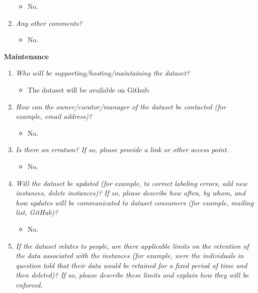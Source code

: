 \documentclass[
]{article}
\providecommand{\tightlist}{%
  \setlength{\itemsep}{0pt}\setlength{\parskip}{0pt}}
\begin{document}
\begin{enumerate}
  \begin{itemize}
  \tightlist
  \item
    No.
  \end{itemize}
\item
  \emph{Any other comments?}

  \begin{itemize}
  \tightlist
  \item
    No.
  \end{itemize}
\end{enumerate}

\textbf{Maintenance}

\begin{enumerate}
\def\labelenumi{\arabic{enumi}.}
\tightlist
\item
  \emph{Who will be supporting/hosting/maintaining the dataset?}

  \begin{itemize}
  \tightlist
  \item
    The dataset will be available on Github
  \end{itemize}
\item
  \emph{How can the owner/curator/manager of the dataset be contacted
  (for example, email address)?}

  \begin{itemize}
  \tightlist
  \item
    No.
  \end{itemize}
\item
  \emph{Is there an erratum? If so, please provide a link or other
  access point.}

  \begin{itemize}
  \tightlist
  \item
    No.
  \end{itemize}
\item
  \emph{Will the dataset be updated (for example, to correct labeling
  errors, add new instances, delete instances)? If so, please describe
  how often, by whom, and how updates will be communicated to dataset
  consumers (for example, mailing list, GitHub)?}

  \begin{itemize}
  \tightlist
  \item
    No.
  \end{itemize}
\item
  \emph{If the dataset relates to people, are there applicable limits on
  the retention of the data associated with the instances (for example,
  were the individuals in question told that their data would be
  retained for a fixed period of time and then deleted)? If so, please
  describe these limits and explain how they will be enforced.}


\end{enumerate}
\end{document}
